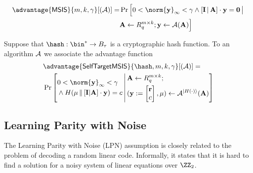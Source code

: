 \begin{definition}
\begin{align*}
    \advantage{\msis}{m,k,\gamma}[(\Ac)]=
    &\Pr\Big[0<\norm{\vc{y}}_\infty <\gamma  \wedge \vc{[I\,\vert\, A]\cdot y=0}
    \,\big|\, \\
    &\vc{A}\gets R^{m\times k}_q; \vc{y}\gets\Ac(\vc{\vc{A}})\Big]
\end{align*}
\end{definition}

\begin{definition}
\label{def:selftargetSIS}
Suppose that $\hash:\bin^\ast\to B_\tau$ is a cryptographic hash
function. To an algorithm $\mathcal{A}$ we associate the advantage function
\begin{align*}
    &\advantage{\selfmsis}{\hash,m,k,\gamma}[(\Ac)]=\\
    &\Pr\left[
    \begin{aligned}
        &0<\norm{\vc{y}}_\infty <\gamma \\
        &\wedge H(\mu \,\Vert\, \vc{[I\vert A]\cdot y})=c
    \end{aligned}
    \,\middle|\,
    \begin{aligned}
        &\vc{A}\gets R^{m\times k}_q;\\ &(\vc{y}:=\begin{bmatrix}\vc{r}\\c\end{bmatrix},\mu)\gets\Ac^{|H(\cdot)\rangle}(\vc{\vc{A}})
    \end{aligned}
    \right]
\end{align*}
\end{definition}

\subsection{Learning Parity with Noise}
The Learning Parity with Noise (LPN) assumption is closely related to the problem of decoding a random linear code. Informally, it states that it is hard to find a solution for a noisy system of linear equations over $\ZZ_2$.

